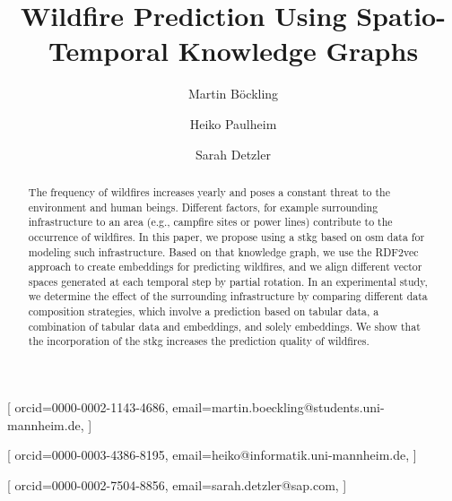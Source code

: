 \documentclass[
]{ceurart}
\begin{document}


\title{Wildfire Prediction Using Spatio-Temporal Knowledge Graphs}

\author[1,2]{Martin B\"ockling}[%
	orcid=0000-0002-1143-4686,
	email=martin.boeckling@students.uni-mannheim.de,
]
\cormark[1]
\fnmark[1]
\address[1]{University of Mannheim, Data and Web Science Group,
	B6, 26, 68161 Mannheim}
\address[2]{SAP SE,
	Dietmar-Hopp-Allee 16, 69190 Walldorf}

\author[1]{Heiko Paulheim}[%
	orcid=0000-0003-4386-8195,
	email=heiko@informatik.uni-mannheim.de,
]
\cormark[1]
\fnmark[1]

\author[2]{Sarah Detzler}[%
	orcid=0000-0002-7504-8856,
	email=sarah.detzler@sap.com,
]
\cormark[1]
\fnmark[1]


\begin{abstract}
	The frequency of wildfires increases yearly and poses a constant threat to the environment and human beings. Different factors, for example surrounding infrastructure to an area (e.g., campfire sites or power lines) contribute to the occurrence of wildfires. In this paper, we propose using a \gls*{stkg} based on \gls*{osm} data for modeling such infrastructure. Based on that knowledge graph, we use the RDF2vec approach to create embeddings for predicting wildfires, and we align different vector spaces generated at each temporal step by partial rotation. In an experimental study, we determine the effect of the surrounding infrastructure by comparing different data composition strategies, which involve a prediction based on tabular data, a combination of tabular data and embeddings, and solely embeddings. We show that the incorporation of the \gls*{stkg} increases the prediction quality of wildfires.
\end{abstract}
\end{document}
